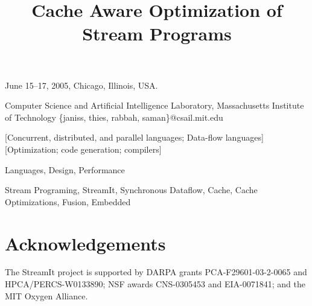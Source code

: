 \documentclass[preprint]{sigplanconf}
\begin{document}
 {June 15--17, 2005, Chicago, Illinois, USA.}

\title{Cache Aware Optimization of Stream Programs}
	     {Computer Science and Artificial Intelligence Laboratory, Massachusetts Institute of Technology}
	     {\{janiss, thies, rabbah, saman\}@csail.mit.edu}

\maketitle

\begin{abstract}

\end{abstract}

[Concurrent, distributed, and parallel languages; Data-flow languages]
[Optimization; code generation; compilers]

\terms 
Languages, Design, Performance

\keywords
Stream Programing, StreamIt, Synchronous Dataflow, Cache, Cache
Optimizations, Fusion, Embedded










\section{Acknowledgements}
The StreamIt project is
supported by DARPA grants PCA-F29601-03-2-0065 and
HPCA/PERCS-W0133890; NSF awards CNS-0305453 and EIA-0071841; and the
MIT Oxygen Alliance.






\end{document}

